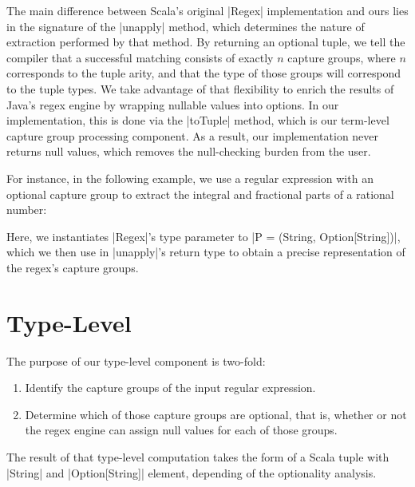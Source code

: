 The main difference between Scala's original |Regex| implementation and ours lies in the signature of the |unapply| method, which determines the nature of extraction performed by that method.
By returning an optional tuple, we tell the compiler that a successful matching consists of exactly $n$ capture groups, where $n$ corresponds to the tuple arity, and that the type of those groups will correspond to the tuple types.
We take advantage of that flexibility to enrich the results of Java's regex engine by wrapping nullable values into options.
In our implementation, this is done via the |toTuple| method, which is our
term-level capture group processing component.
As a result, our implementation never returns null values, which removes the null-checking burden from the user.

For instance, in the following example, we use a regular expression with an optional capture group to extract the integral and fractional parts of a rational number:

\regexRational

\noindent
Here, we instantiates |Regex|'s type parameter to |P = (String, Option[String])|, which we then use in |unapply|'s return type to obtain a precise representation of the regex's capture groups.

\section{Type-Level}
\label{sec:type-level}

The purpose of our type-level component is two-fold:

\begin{enumerate}
  \item Identify the capture groups of the input regular expression.
  \item Determine which of those capture groups are optional, that is, whether or not the regex engine can assign null values for each of those groups.
\end{enumerate}

\noindent
The result of that type-level computation takes the form of a Scala tuple with |String| and |Option[String]| element, depending of the optionality analysis.


